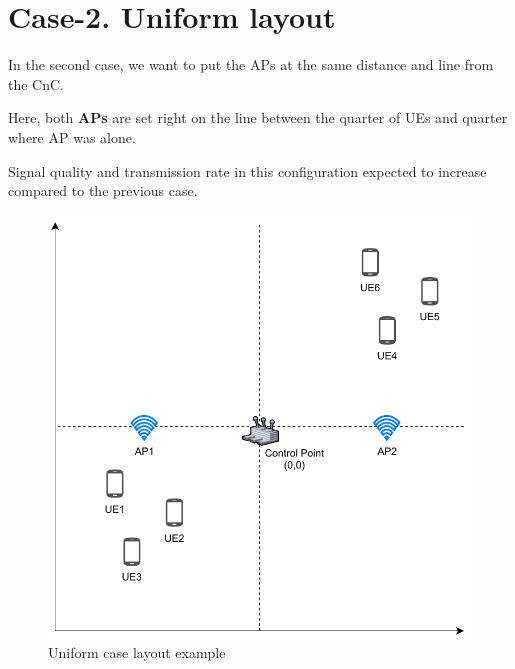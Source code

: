 \section{Case-2. Uniform layout}\label{case-2.-uniform-layout}

In the second case, we want to put the APs at the same distance and line
from the CnC.

Here, both \textbf{APs} are set right on the line between the quarter of UEs and quarter where AP was alone.

Signal quality and transmission rate in this configuration expected to increase compared to the previous case.

\begin{figure}[H]
	\centering
	\includegraphics[width=\linewidth,keepaspectratio]{images/05-cases-description-Uniform.pdf}
\caption{Uniform case layout example}
\end{figure}

